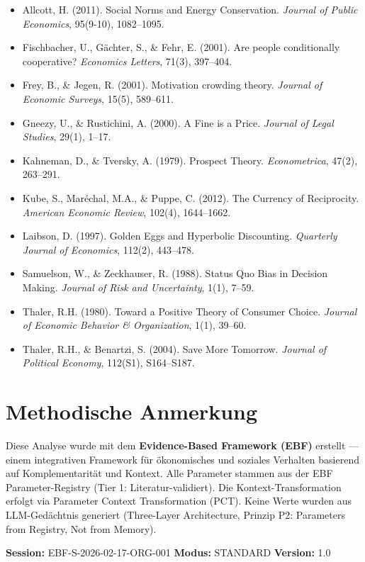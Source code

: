 \documentclass[11pt,a4paper]{article}
\begin{document}
\begin{itemize}[noitemsep]
\item Allcott, H. (2011). Social Norms and Energy Conservation. \textit{Journal of Public Economics}, 95(9-10), 1082--1095.
\item Fischbacher, U., G\"achter, S., \& Fehr, E. (2001). Are people conditionally cooperative? \textit{Economics Letters}, 71(3), 397--404.
\item Frey, B., \& Jegen, R. (2001). Motivation crowding theory. \textit{Journal of Economic Surveys}, 15(5), 589--611.
\item Gneezy, U., \& Rustichini, A. (2000). A Fine is a Price. \textit{Journal of Legal Studies}, 29(1), 1--17.
\item Kahneman, D., \& Tversky, A. (1979). Prospect Theory. \textit{Econometrica}, 47(2), 263--291.
\item Kube, S., Mar\'echal, M.A., \& Puppe, C. (2012). The Currency of Reciprocity. \textit{American Economic Review}, 102(4), 1644--1662.
\item Laibson, D. (1997). Golden Eggs and Hyperbolic Discounting. \textit{Quarterly Journal of Economics}, 112(2), 443--478.
\item Samuelson, W., \& Zeckhauser, R. (1988). Status Quo Bias in Decision Making. \textit{Journal of Risk and Uncertainty}, 1(1), 7--59.
\item Thaler, R.H. (1980). Toward a Positive Theory of Consumer Choice. \textit{Journal of Economic Behavior \& Organization}, 1(1), 39--60.
\item Thaler, R.H., \& Benartzi, S. (2004). Save More Tomorrow. \textit{Journal of Political Economy}, 112(S1), S164--S187.
\end{itemize}


\section*{Methodische Anmerkung}

{\small
Diese Analyse wurde mit dem \textbf{Evidence-Based Framework (EBF)} erstellt --- einem integrativen Framework f\"ur \"okonomisches und soziales Verhalten basierend auf Komplementarit\"at und Kontext. Alle Parameter stammen aus der EBF Parameter-Registry (Tier 1: Literatur-validiert). Die Kontext-Transformation erfolgt via Parameter Context Transformation (PCT). Keine Werte wurden aus LLM-Ged\"achtnis generiert (Three-Layer Architecture, Prinzip P2: \guillemotleft Parameters from Registry, Not from Memory\guillemotright).

\vspace{6pt}
\textbf{Session:} EBF-S-2026-02-17-ORG-001 \quad \textbf{Modus:} STANDARD \quad \textbf{Version:} 1.0
}
\end{document}
